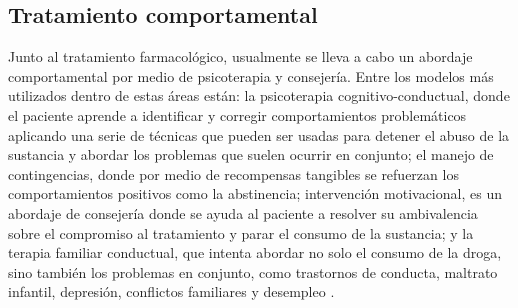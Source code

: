\subsection{Tratamiento comportamental}
Junto al tratamiento farmacológico, usualmente se lleva a cabo un abordaje comportamental por medio de psicoterapia y consejería.
Entre los modelos más utilizados dentro de estas áreas están:
la psicoterapia cognitivo-conductual, donde el paciente aprende a identificar y corregir comportamientos problemáticos aplicando una serie de técnicas que pueden ser usadas para detener el abuso de la sustancia y abordar los problemas que suelen ocurrir en conjunto;
el manejo de contingencias, donde por medio de recompensas tangibles se refuerzan los comportamientos positivos como la abstinencia;
intervención motivacional, es un abordaje de consejería donde se ayuda al paciente a resolver su ambivalencia sobre el compromiso al tratamiento y parar el consumo de la sustancia;
y la terapia familiar conductual, que intenta abordar no solo el consumo de la droga, sino también los problemas en conjunto, como trastornos de conducta, maltrato infantil, depresión, conflictos familiares y desempleo \parencite{Volkow2008}.

